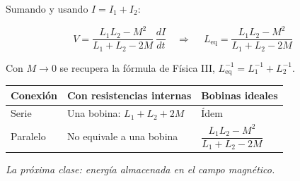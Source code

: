 \documentclass[12pt,a4paper]{article}
\begin{document}
Sumando y usando $I = I_1+I_2$:

\[
V = \frac{L_1L_2-M^2}{L_1+L_2-2M}\,\frac{dI}{dt}
\quad\Longrightarrow\quad
\boxed{\ L_{\text{eq}} = \frac{L_1L_2-M^2}{L_1+L_2-2M}\ }
\]

Con $M\to0$ se recupera la fórmula de Física III,
$L_{\text{eq}}^{-1} = L_1^{-1}+L_2^{-1}$.

\begin{center}
\renewcommand{\arraystretch}{1.35}
\small
\begin{tabularx}{\textwidth}{l>{\raggedright\arraybackslash}X>{\raggedright\arraybackslash}X}
\toprule
\textbf{Conexión} & \textbf{Con resistencias internas} & \textbf{Bobinas ideales} \\
\midrule
Serie & Una bobina: $L_1+L_2+2M$ & Ídem \\
Paralelo & No equivale a una bobina & $\dfrac{L_1L_2-M^2}{L_1+L_2-2M}$ \\
\bottomrule
\end{tabularx}
\end{center}

\noindent\emph{La próxima clase: energía almacenada en el campo magnético.}
\end{document}
